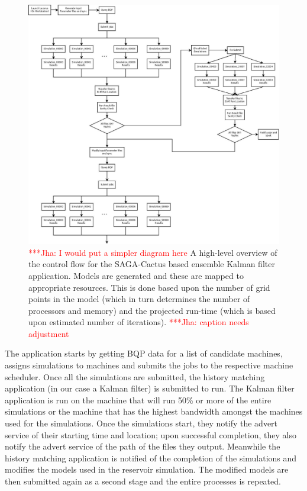 \documentclass[conference,final]{IEEEtran}
\newcommand{\jhanote}[1]{ {\textcolor{red} { ***Jha: #1 }}}
\newcommand{\jhanote}[1]{}
\begin{document}
\begin{figure}
\begin{center}
\includegraphics[scale=0.18]{./figures/Lazarus_Workflow_Alternate.png}
\end{center}
\caption{\jhanote{I would put a simpler diagram here} A high-level
  overview of the control flow for the SAGA-Cactus based ensemble
  Kalman filter application. Models are generated and these are mapped
  to appropriate resources. This is done based upon the number of grid
  points in the model (which in turn determines the number of
  processors and memory) and the projected run-time (which is based
  upon estimated number of iterations). \jhanote{caption needs
    adjustment}}
\label{fig:controlflow}
\end{figure}

The application starts by getting BQP data for a list of candidate
machines, assigns simulations to machines and submits the jobs to the
respective machine scheduler. Once all the simulations are submitted,
the history matching application (in our case a Kalman filter) is
submitted to run. The Kalman filter application is run on the
machine that will run 50\% or more of the entire simulations or the
machine that has the highest bandwidth amongst the machines used for
the simulations.  Once the simulations start, they notify the advert
service of their starting time and location; upon successful
completion, they also notify the advert service of the path of the
files they output.  Meanwhile the history matching application is
notified of the completion of the simulations and modifies the models
used in the reservoir simulation. The modified models are then
submitted again as a second stage and the entire processes is
repeated.
\end{document}
